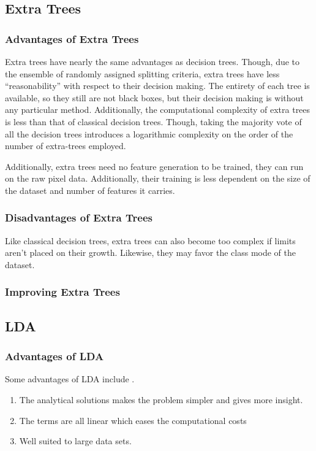 \subsection{Extra Trees}
\subsubsection{Advantages of Extra Trees}

Extra trees have nearly the same advantages as decision trees. Though, due to the ensemble of randomly assigned splitting criteria, extra trees have less ``reasonability'' with respect to their decision making. The entirety of each tree is available, so they still are not black boxes, but their decision making is without any particular method. Additionally, the computational complexity of extra trees is less than that of classical decision trees. Though, taking the majority vote of all the decision trees introduces a logarithmic complexity on the order of the number of extra-trees employed. 

Additionally, extra trees need no feature generation to be trained, they can run on the raw pixel data. Additionally, their training is less dependent on the size of the dataset and number of features it carries.

\subsubsection{Disadvantages of Extra Trees}

Like classical decision trees, extra trees can also become too complex if limits aren't placed on their growth. Likewise, they may favor the class mode of the dataset. 

\subsubsection{Improving Extra Trees}



\subsection{LDA}
\subsubsection{Advantages of LDA}
Some advantages of LDA include \cite{book:advlda}.
%
\begin{enumerate}
	\item The analytical solutions makes the problem simpler and gives more insight.
	\item The terms are all linear which eases the computational costs
	\item Well suited to large data sets.
\end{enumerate}

